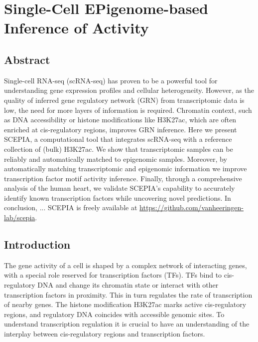 \chapter{Single-Cell EPigenome-based Inference of Activity}\thumbforchapter
{}
\newpage

\section{Abstract}

Single-cell RNA-seq (scRNA-seq) has proven to be a powerful tool for understanding gene expression profiles and cellular heterogeneity. However, as the quality of inferred gene regulatory network (GRN) from transcriptomic data is low, the need for more layers of information is required. Chromatin context, such as DNA accessibility or histone modifications like H3K27ac, which are often enriched at cis-regulatory regions, improves GRN inference. Here we present SCEPIA, a computational tool that integrates scRNA-seq with a reference collection of (bulk) H3K27ac. We show that transcriptomic samples can be reliably and automatically matched to epigenomic samples. Moreover, by automatically matching transcriptomic and epigenomic information we improve transcription factor motif activity inference. Finally, through a comprehensive analysis of the human heart, we validate SCEPIA's capability to accurately identify known transcription factors while uncovering novel predictions. In conclusion, ...  SCEPIA is freely available at \url{https://github.com/vanheeringen-lab/scepia}.

\section{Introduction}

The gene activity of a cell is shaped by a complex network of interacting genes, with a special role reserved for transcription factors (TFs). TFs bind to cis-regulatory DNA and change its chromatin state or interact with other transcription factors in proximity\cite{Spitz2012}. This in turn regulates the rate of transcription of nearby genes. The histone modification H3K27ac marks active cis-regulatory regions\cite{Creyghton2010}, and regulatory DNA coincides with accessible genomic sites\cite{Tsompana2014}. To understand transcription regulation it is crucial to have an understanding of the interplay between cis-regulatory regions and transcription factors. 


